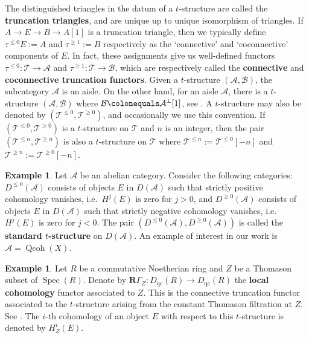 \documentclass[11pt]{amsart}
\theoremstyle{plain}
\theoremstyle{definition}
\newtheorem{example}[theorem]{Example}
\numberwithin{equation}{section}
\numberwithin{theorem}{section}
\begin{document}
The distinguished triangles in the datum of a $t$-structure are called the \textbf{truncation triangles}, and are unique up to unique isomorphism of triangles. If $A\to E \to B \to A[1]$ is a truncation triangle, then we typically define $\tau^{\leq 0} E:=A$ and $\tau^{\geq 1}:=B$ respectively as the `connective' and `coconnective' components of $E$. In fact, these assignments give us well-defined functors $\tau^{\leq 0} \colon \mathcal{T}\to \mathcal{A}$ and $\tau^{\geq 1} \colon \mathcal{T} \to \mathcal{B}$, which are respectively called the \textbf{connective} and \textbf{coconnective truncation functors}. Given a $t$-structure $(\mathcal{A},\mathcal{B})$, the subcategory $\mathcal{A}$ is an aisle. On the other hand, for an aisle $\mathcal{A}$, there is a $t$-structure $(\mathcal{A},\mathcal{B})$ where $\mathcal{B} \colonequals \mathcal{A}^{\perp}[1]$, see \cite{Keller/Vossieck:1988}. A $t$-structure may also be denoted by $(\mathcal{T}^{\leq 0}, \mathcal{T}^{\geq 0})$, and occasionally we use this convention. If $(\mathcal{T}^{\leq 0}, \mathcal{T}^{\geq 0})$ is a $t$-structure on $\mathcal{T}$ and $n$ is an integer, then the pair $(\mathcal{T}^{\leq n}, \mathcal{T}^{\geq n})$ is also a $t$-structure on $\mathcal{T}$ where $\mathcal{T}^{\leq n}:= \mathcal{T}^{\leq 0}[-n]$ and $\mathcal{T}^{\geq n}:= \mathcal{T}^{\geq 0}[-n]$. 

\begin{example}\label{ex:standard_t_structure}
    Let $\mathcal{A}$ be an abelian category. Consider the following categories: $D^{\leq 0}(\mathcal{A})$ consists of objects $E$ in $D(\mathcal{A})$ such that strictly positive cohomology vanishes, i.e.\ $H^j (E)$ is zero for $j >0$, and $D^{\geq 0}(\mathcal{A})$ consists of objects $E$ in $D(\mathcal{A})$ such that strictly negative cohomology vanishes, i.e.\ $H^j (E)$ is zero for $j <0$. The pair $(D^{\leq 0}(\mathcal{A}), D^{\geq 0}(\mathcal{A}))$ is called the \textbf{standard $t$-structure} on $D(\mathcal{A})$. An example of interest in our work is $\mathcal{A}=\operatorname{Qcoh}(X)$.
\end{example}

\begin{example}
    Let $R$ be a commutative Noetherian ring and $Z$ be a Thomason subset of $\operatorname{Spec}(R)$. Denote by $\mathbf{R}\Gamma_Z \colon D_{\operatorname{qc}}(R)\to D_{\operatorname{qc}}(R)$ the \textbf{local cohomology} functor associated to $Z$. This is the connective truncation functor associated to the $t$-structure arising from the constant Thomason filtration at $Z$. See \cite[Example 3.4]{Smith:2022}. The $i$-th cohomology of an object $E$ with respect to this $t$-structure is denoted by $H^i_Z (E)$.
\end{example}
\end{document}
